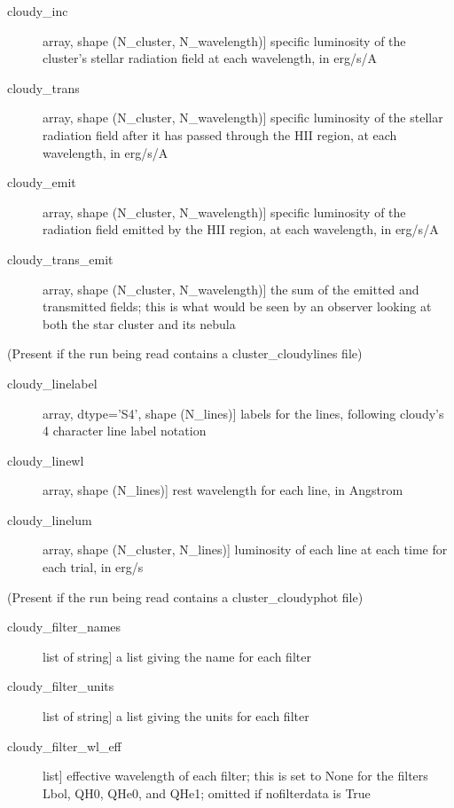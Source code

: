 \documentclass[letterpaper,10pt,english]{sphinxmanual}
\begin{document}
\begin{fulllineitems}
\begin{description}
\begin{description}
\item[{cloudy\_inc}] \leavevmode{[}array, shape (N\_cluster, N\_wavelength){]}
specific luminosity of the cluster’s stellar radiation field at
each wavelength, in erg/s/A

\item[{cloudy\_trans}] \leavevmode{[}array, shape (N\_cluster, N\_wavelength){]}
specific luminosity of the stellar radiation field after it has
passed through the HII region, at each wavelength, in erg/s/A

\item[{cloudy\_emit}] \leavevmode{[}array, shape (N\_cluster, N\_wavelength){]}
specific luminosity of the radiation field emitted by the HII
region, at each wavelength, in erg/s/A

\item[{cloudy\_trans\_emit}] \leavevmode{[}array, shape (N\_cluster, N\_wavelength){]}
the sum of the emitted and transmitted fields; this is what
would be seen by an observer looking at both the star cluster
and its nebula

\end{description}

(Present if the run being read contains a cluster\_cloudylines file)
\begin{description}
\item[{cloudy\_linelabel}] \leavevmode{[}array, dtype=’S4’, shape (N\_lines){]}
labels for the lines, following cloudy’s 4 character line label
notation

\item[{cloudy\_linewl}] \leavevmode{[}array, shape (N\_lines){]}
rest wavelength for each line, in Angstrom

\item[{cloudy\_linelum}] \leavevmode{[}array, shape (N\_cluster, N\_lines){]}
luminosity of each line at each time for each trial, in erg/s

\end{description}

(Present if the run being read contains a cluster\_cloudyphot file)
\begin{description}
\item[{cloudy\_filter\_names}] \leavevmode{[}list of string{]}
a list giving the name for each filter

\item[{cloudy\_filter\_units}] \leavevmode{[}list of string{]}
a list giving the units for each filter

\item[{cloudy\_filter\_wl\_eff}] \leavevmode{[}list{]}
effective wavelength of each filter; this is set to None for the
filters Lbol, QH0, QHe0, and QHe1; omitted if nofilterdata is
True


\end{description}
\end{description}
\end{fulllineitems}
\end{document}

